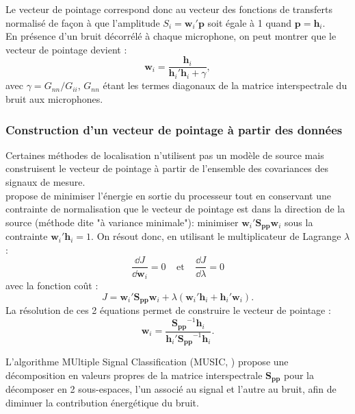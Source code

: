 Le vecteur de pointage correspond donc au vecteur des fonctions de transferts normalisé de façon à que l'amplitude $S_i=\bm{w}_i'\bm{p}$ soit égale à 1 quand $\bm{p}=\bm{h}_i$.\\

En présence d'un bruit décorrélé à chaque microphone, on peut montrer que le vecteur de pointage devient : 
\begin{equation}
	\bm{w}_i=\frac{\bm{h}_i}{\bm{h}_i'\bm{h}_i+\gamma},
\end{equation}
avec $\gamma=G_{nn}/G_{ii}$, $G_{nn}$ étant les termes diagonaux de la matrice interspectrale du bruit aux microphones.




\subsubsection{Construction d'un vecteur de pointage à partir des données}
Certaines méthodes de localisation n'utilisent pas un modèle de source mais construisent le vecteur de pointage à partir de l'ensemble des covariances des signaux de mesure. \\
\cite{schmidt_1986} propose de minimiser l'énergie en sortie du processeur tout en conservant une contrainte de normalisation que le vecteur de pointage est dans la direction de la source (méthode dite "à variance minimale"): minimiser $\bm{w}_i'\bm{S_{pp}}\bm{w}_i$ sous la contrainte $\bm{w}_i'\bm{h}_i=1$.
On résout donc, en utilisant le multiplicateur de Lagrange $\lambda$ : 
\begin{equation}
\frac{\dd J}{\dd\bm{w}_i}=0~~~~~\text{et}~~~~~\frac{\dd J}{\dd\lambda}=0
\end{equation}
avec la fonction coût : 
\begin{equation}
J=\bm{w}_i'\bm{S_{pp}}\bm{w}_i + \lambda(\bm{w}_i'\bm{h}_i+\bm{h}_i'\bm{w}_i).
\end{equation}
La résolution de ces 2 équations permet de construire le vecteur de pointage : 
\begin{equation}
	\bm{w}_i=\frac{\bm{S_{pp}}^{-1}\bm{h}_{i}}{\bm{h}_i'\bm{S_{pp}}^{-1}\bm{h}_{i}}.
\end{equation}



L'algorithme MUltiple Signal Classification (MUSIC, \cite{schmidt_1986}) propose une décomposition en valeurs propres de la matrice interspectrale $\bm{S_{pp}}$ pour la décomposer en 2 sous-espaces, l’un associé au signal et l’autre au bruit, afin de diminuer la contribution énergétique du bruit.\\

